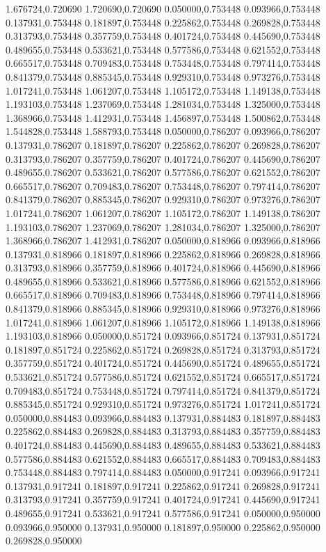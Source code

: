 1.676724,0.720690
1.720690,0.720690
0.050000,0.753448
0.093966,0.753448
0.137931,0.753448
0.181897,0.753448
0.225862,0.753448
0.269828,0.753448
0.313793,0.753448
0.357759,0.753448
0.401724,0.753448
0.445690,0.753448
0.489655,0.753448
0.533621,0.753448
0.577586,0.753448
0.621552,0.753448
0.665517,0.753448
0.709483,0.753448
0.753448,0.753448
0.797414,0.753448
0.841379,0.753448
0.885345,0.753448
0.929310,0.753448
0.973276,0.753448
1.017241,0.753448
1.061207,0.753448
1.105172,0.753448
1.149138,0.753448
1.193103,0.753448
1.237069,0.753448
1.281034,0.753448
1.325000,0.753448
1.368966,0.753448
1.412931,0.753448
1.456897,0.753448
1.500862,0.753448
1.544828,0.753448
1.588793,0.753448
0.050000,0.786207
0.093966,0.786207
0.137931,0.786207
0.181897,0.786207
0.225862,0.786207
0.269828,0.786207
0.313793,0.786207
0.357759,0.786207
0.401724,0.786207
0.445690,0.786207
0.489655,0.786207
0.533621,0.786207
0.577586,0.786207
0.621552,0.786207
0.665517,0.786207
0.709483,0.786207
0.753448,0.786207
0.797414,0.786207
0.841379,0.786207
0.885345,0.786207
0.929310,0.786207
0.973276,0.786207
1.017241,0.786207
1.061207,0.786207
1.105172,0.786207
1.149138,0.786207
1.193103,0.786207
1.237069,0.786207
1.281034,0.786207
1.325000,0.786207
1.368966,0.786207
1.412931,0.786207
0.050000,0.818966
0.093966,0.818966
0.137931,0.818966
0.181897,0.818966
0.225862,0.818966
0.269828,0.818966
0.313793,0.818966
0.357759,0.818966
0.401724,0.818966
0.445690,0.818966
0.489655,0.818966
0.533621,0.818966
0.577586,0.818966
0.621552,0.818966
0.665517,0.818966
0.709483,0.818966
0.753448,0.818966
0.797414,0.818966
0.841379,0.818966
0.885345,0.818966
0.929310,0.818966
0.973276,0.818966
1.017241,0.818966
1.061207,0.818966
1.105172,0.818966
1.149138,0.818966
1.193103,0.818966
0.050000,0.851724
0.093966,0.851724
0.137931,0.851724
0.181897,0.851724
0.225862,0.851724
0.269828,0.851724
0.313793,0.851724
0.357759,0.851724
0.401724,0.851724
0.445690,0.851724
0.489655,0.851724
0.533621,0.851724
0.577586,0.851724
0.621552,0.851724
0.665517,0.851724
0.709483,0.851724
0.753448,0.851724
0.797414,0.851724
0.841379,0.851724
0.885345,0.851724
0.929310,0.851724
0.973276,0.851724
1.017241,0.851724
0.050000,0.884483
0.093966,0.884483
0.137931,0.884483
0.181897,0.884483
0.225862,0.884483
0.269828,0.884483
0.313793,0.884483
0.357759,0.884483
0.401724,0.884483
0.445690,0.884483
0.489655,0.884483
0.533621,0.884483
0.577586,0.884483
0.621552,0.884483
0.665517,0.884483
0.709483,0.884483
0.753448,0.884483
0.797414,0.884483
0.050000,0.917241
0.093966,0.917241
0.137931,0.917241
0.181897,0.917241
0.225862,0.917241
0.269828,0.917241
0.313793,0.917241
0.357759,0.917241
0.401724,0.917241
0.445690,0.917241
0.489655,0.917241
0.533621,0.917241
0.577586,0.917241
0.050000,0.950000
0.093966,0.950000
0.137931,0.950000
0.181897,0.950000
0.225862,0.950000
0.269828,0.950000
